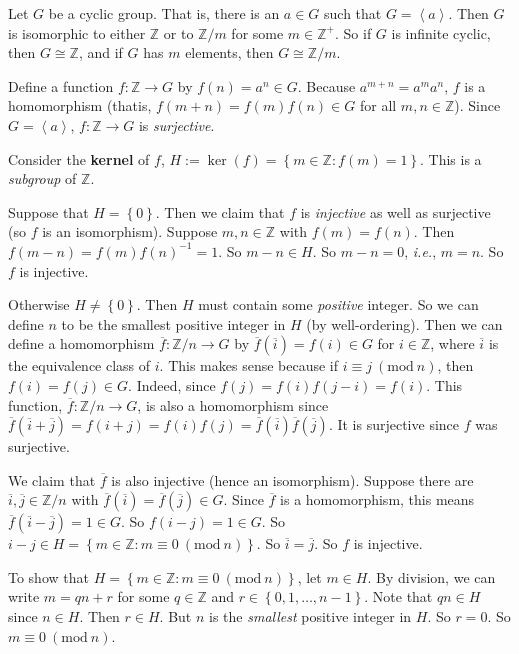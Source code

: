 \documentclass{notes}
\begin{document}
\begin{thm}
  Let $G$ be a cyclic group.
  That is, there is an $a \in G$ such that $G = \left \langle a \right \rangle$.
  Then $G$ is isomorphic to either $\mathbb Z$ or to $\mathbb Z / m$ for some $m \in \mathbb Z^+$.
  So if $G$ is infinite cyclic, then $G \cong \mathbb Z$, and if $G$ has $m$ elements, then $G \cong \mathbb Z / m$.
\end{thm}

\begin{prf}
  Define a function $f \colon \mathbb Z \to G$ by $f(n) = a^n \in G$.
  Because $a^{m + n} = a^m a^n$, $f$ is a homomorphism (thatis, $f(m + n) = f(m) f(n) \in G$ for all $m, n \in \mathbb Z$).
  Since $G = \left \langle a \right \rangle$, $f \colon \mathbb Z \to G$ is \textit{surjective}.
  
  Consider the {\boldmath \bfseries kernel} of $f$, $H := \ker(f) = \left \{ m \in \mathbb Z : f(m) = 1 \right \}$.
  This is a \textit{subgroup} of $\mathbb Z$.
  
  Suppose that $H = \left \{ 0 \right \}$.
  Then we claim that $f$ is \textit{injective} as well as surjective (so $f$ is an isomorphism).
  Suppose $m, n \in \mathbb Z$ with $f(m) = f(n)$.
  Then $f(m - n) = f(m) f(n)^{-1} = 1$.
  So $m - n \in H$.
  So $m - n = 0$, \textit{i.e.}, $m = n$.
  So $f$ is injective.

  Otherwise $H \neq \left \{ 0 \right \}$.
  Then $H$ must contain some \textit{positive} integer.
  So we can define $n$ to be the smallest positive integer in $H$ (by well-ordering).
  Then we can define a homomorphism $\overline f \colon \mathbb Z / n \to G$ by $\overline f\left ( \overline i \right ) = f(i) \in G$ for $i \in \mathbb Z$, where $\overline i$ is the equivalence class of $i$.
  This makes sense because if $i \equiv j\ (\mathrm{mod}\ n)$, then $f(i) = f(j) \in G$.
  Indeed, since $f(j) = f(i) f(j - i) = f(i)$.
  This function, $\overline f \colon \mathbb Z / n \to G$, is also a homomorphism since $\overline f\left ( \overline i + \overline j \right ) = f(i + j) = f(i) f(j) = \overline f\left ( \overline i \right ) \overline f\left ( \overline j \right )$.
  It is surjective since $f$ was surjective.

  We claim that $\overline f$ is also injective (hence an isomorphism).
  Suppose there are $\overline i, \overline j \in \mathbb Z / n$ with $\overline f\left ( \overline i \right ) = \overline f\left ( \overline j \right ) \in G$.
  Since $\overline f$ is a homomorphism, this means $\overline f\left ( \overline i - \overline j \right ) = 1 \in G$.
  So $f(i - j) = 1 \in G$.
  So $i - j \in H = \left \{ m \in \mathbb Z : m \equiv 0\ (\mathrm{mod}\ n) \right \}$.
  So $\overline i = \overline j$.
  So $f$ is injective.

  To show that $H = \left \{ m \in \mathbb Z : m \equiv 0\ (\mathrm{mod}\ n) \right \}$, let $m \in H$.
  By division, we can write $m = q n + r$ for some $q \in \mathbb Z$ and $r \in \left \{ 0, 1, \dots, n - 1 \right \}$.
  Note that $q n \in H$ since $n \in H$.
  Then $r \in H$.
  But $n$ is the \textit{smallest} positive integer in $H$.
  So $r = 0$.
  So $m \equiv 0\ (\mathrm{mod}\ n)$.
\end{prf}
\end{document}
